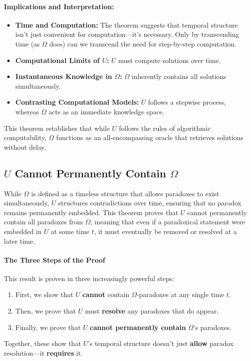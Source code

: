 \documentclass[12pt]{article}
\begin{document}
\paragraph{Implications and Interpretation:}
\begin{itemize}
    \item \textbf{Time and Computation:} The theorem suggests that temporal structure isn't just convenient for computation—it's necessary. Only by transcending time (as \( \Omega \) does) can we transcend the need for step-by-step computation.
    \item \textbf{Computational Limits of \( U \):} \( U \) must compute solutions over time.
    \item \textbf{Instantaneous Knowledge in \( \Omega \):} \( \Omega \) inherently contains all solutions simultaneously.
    \item \textbf{Contrasting Computational Models:} \( U \) follows a stepwise process, whereas \( \Omega \) acts as an immediate knowledge space.
\end{itemize}

This theorem establishes that while \( U \) follows the rules of algorithmic computability, \( \Omega \) functions as an all-encompassing oracle that retrieves solutions without delay.


\subsection{\( U \) Cannot Permanently Contain \( \Omega \)}

While \( \Omega \) is defined as a timeless structure that allows paradoxes to exist simultaneously, \( U \) structures contradictions over time, ensuring that no paradox remains permanently embedded. This theorem proves that \( U \) cannot permanently contain all paradoxes from \( \Omega \), meaning that even if a paradoxical statement were embedded in \( U \) at some time \( t \), it must eventually be removed or resolved at a later time.

\paragraph{The Three Steps of the Proof}
This result is proven in three increasingly powerful steps:
\begin{enumerate}
    \item First, we show that \( U \) \textbf{cannot} contain \( \Omega \)-paradoxes at any single time \( t \).
    \item Then, we prove that \( U \) must \textbf{resolve} any paradoxes that do appear.
    \item Finally, we prove that \( U \) \textbf{cannot permanently contain} \( \Omega \)'s paradoxes.
\end{enumerate}
Together, these show that \( U \)'s temporal structure doesn’t just \textbf{allow} paradox resolution—it \textbf{requires} it.
\end{document}
